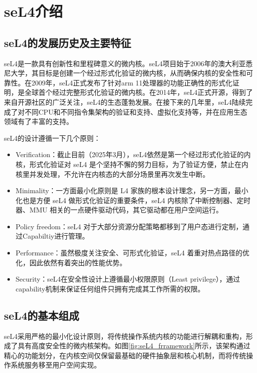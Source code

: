 \chapter{seL4介绍}
\label{chap:seL4_intro}
\section{seL4的发展历史及主要特征}
seL4是一款具有创新性和里程碑意义的微内核。seL4项目始于2006年的澳大利亚悉尼大学，其目标是创建一个经过形式化验证的微内核，从而确保内核的安全性和可靠性。在2009年，seL4正式发布了针对arm 11处理器的功能正确性的形式化证明，是全球首个经过完整形式化验证的微内核。在2014年，seL4正式开源，得到了来自开源社区的广泛关注，seL4的生态蓬勃发展。在接下来的几年里，seL4陆续完成了对不同CPU和不同指令集架构的验证和支持、虚拟化支持等，并在应用生态领域有了丰富的支持。

seL4的设计遵循一下几个原则\cite{sel4DesignPrinciples}： 
\begin{itemize}
  \item Verification：截止目前（2025年3月），seL4依然是第一个经过形式化验证的内核，形式化验证对 seL4 是个坚持不懈的努力目标，为了验证方便，禁止在内核里并发处理，不允许在内核态的大部分场景里再次发生中断。
  \item Minimality：一方面最小化原则是 L4 家族的根本设计理念，另一方面，最小化也是方便 seL4 做形式化验证的重要条件，seL4 内核除了中断控制器、定时器、MMU 相关的一点硬件驱动代码，其它驱动都在用户空间运行。
  \item Policy freedom：seL4 对于大部分资源分配策略都移到了用户态进行定制，通过Capabiltiy进行管理。
  \item Performance：虽然极度关注安全、可形式化验证，seL4 着重对热点路径的优化，因此依然有着突出的性能优势。
  \item Security：seL4在安全性设计上遵循最小权限原则（Least privilege），通过capability机制来保证任何组件只拥有完成其工作所需的权限。
\end{itemize}

\section{seL4的基本组成}
seL4采用严格的最小化设计原则，将传统操作系统内核的功能进行解耦和重构，形成了具有高度安全性的微内核架构。如图\ref{fig:seL4_frramework}所示，该架构通过精心的功能划分，在内核空间仅保留最基础的硬件抽象层和核心机制，而将传统操作系统服务移至用户空间实现。

